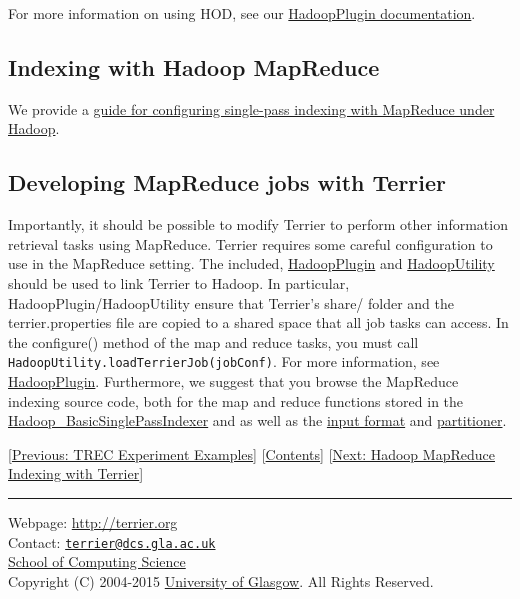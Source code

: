 For more information on using HOD, see our
\href{javadoc/org/terrier/utility/io/HadoopPlugin.html}{HadoopPlugin
documentation}.

\subsection{Indexing with Hadoop
MapReduce}\label{indexing-with-hadoop-mapreduce}

We provide a \href{hadoop_indexing.html}{guide for configuring
single-pass indexing with MapReduce under Hadoop}.

\subsection{Developing MapReduce jobs with
Terrier}\label{developing-mapreduce-jobs-with-terrier}

Importantly, it should be possible to modify Terrier to perform other
information retrieval tasks using MapReduce. Terrier requires some
careful configuration to use in the MapReduce setting. The included,
\href{javadoc/org/terrier/utility/io/HadoopPlugin.html}{HadoopPlugin}
and
\href{javadoc/org/terrier/utility/io/HadoopUtility.html}{HadoopUtility}
should be used to link Terrier to Hadoop. In particular,
HadoopPlugin/HadoopUtility ensure that Terrier's share/ folder and the
terrier.properties file are copied to a shared space that all job tasks
can access. In the configure() method of the map and reduce tasks, you
must call \texttt{HadoopUtility.loadTerrierJob(jobConf)}. For more
information, see
\href{javadoc/org/terrier/utility/io/HadoopPlugin.html}{HadoopPlugin}.
Furthermore, we suggest that you browse the MapReduce indexing source
code, both for the map and reduce functions stored in the
\href{javadoc/org/terrier/structures/indexing/singlepass/hadoop/Hadoop_BasicSinglePassIndexer.html}{Hadoop\_BasicSinglePassIndexer}
and as well as the
\href{javadoc/org/terrier/structures/indexing/singlepass/hadoop/MultiFileCollectionInputFormat.html}{input
format} and
\href{javadoc/org/terrier/structures/indexing/singlepass/hadoop/SplitEmittedTerm.html}{partitioner}.

{[}\href{trec_examples.html}{Previous: TREC Experiment Examples}{]}
{[}\href{index.html}{Contents}{]} {[}\href{hadoop_indexing.html}{Next:
Hadoop MapReduce Indexing with Terrier}{]}

\begin{center}\rule{0.5\linewidth}{\linethickness}\end{center}

Webpage: \url{http://terrier.org}\\
Contact:
\href{mailto:terrier@dcs.gla.ac.uk}{\nolinkurl{terrier@dcs.gla.ac.uk}}\\
\href{http://www.dcs.gla.ac.uk/}{School of Computing Science}\\
Copyright (C) 2004-2015 \href{http://www.gla.ac.uk/}{University of
Glasgow}. All Rights Reserved.

~
